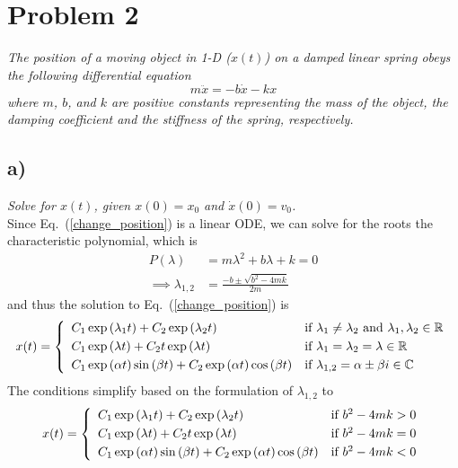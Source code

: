 \documentclass[12pt]{article}
\begin{document}
\section*{Problem 2}
{\it The position of a moving object in 1-D ($x(t)$) on a damped linear spring obeys the following differential equation}
\begin{equation}
	\label{change_position}
	m\ddot{x} = -b\dot{x} - kx
\end{equation}
{\it where $m$, $b$, and $k$ are positive constants representing the mass of the object, the damping coefficient and the stiffness of the spring, respectively.}

\subsection*{ a)}
{\it Solve for $x(t)$, given $x(0) = x_0$ and $\dot{x}(0) = v_0$.} \\

Since Eq.~(\ref{change_position}) is a linear ODE, we can solve for the roots the characteristic polynomial, which is
\begin{align*}
	P(\lambda) &= m\lambda^2 + b\lambda + k = 0 \\[.2cm]
	\implies \lambda_{1,2} &= \frac{-b \pm \sqrt{b^2 - 4mk}}{2m}
\end{align*}
and thus the solution to Eq.~(\ref{change_position}) is
\begin{align*}
	\label{general_soluntion}
	x(t) =  \left\{\begin{array}{ll}
		C_1\exp\qty(\lambda_1 t) + C_2\exp\qty(\lambda_2 t) & \text{if $\lambda_1 \neq \lambda_2$ and $\lambda_1,\lambda_2 \in \mathbb{R}$} \\[.1cm]
		C_1\exp\qty(\lambda t) + C_2 t\exp\qty(\lambda t) & \text{if $\lambda_1 = \lambda_2 = \lambda \in \mathbb{R}$} \\[.1cm]
		C_1\exp\qty(\alpha t)\sin\qty(\beta t) + C_2\exp\qty(\alpha t)\cos\qty(\beta t) & \text{if $\lambda_{1,2} = \alpha \pm \beta i \in \mathbb{C}$}
	\end{array}\right.
\end{align*}
The conditions simplify based on the formulation of $\lambda_{1,2}$ to
\begin{equation}
	\label{general_soluntion}
	x(t) =  \left\{\begin{array}{ll}
		C_1\exp\qty(\lambda_1 t) + C_2\exp\qty(\lambda_2 t) & \text{if $b^2 - 4mk > 0$} \\[.1cm]
		C_1\exp\qty(\lambda t) + C_2 t\exp\qty(\lambda t) & \text{if $b^2 - 4mk = 0$} \\[.1cm]
		C_1\exp\qty(\alpha t)\sin\qty(\beta t) + C_2\exp\qty(\alpha t)\cos\qty(\beta t) & \text{if $b^2 - 4mk < 0$}
	\end{array}\right.
\end{equation}
\end{document}

